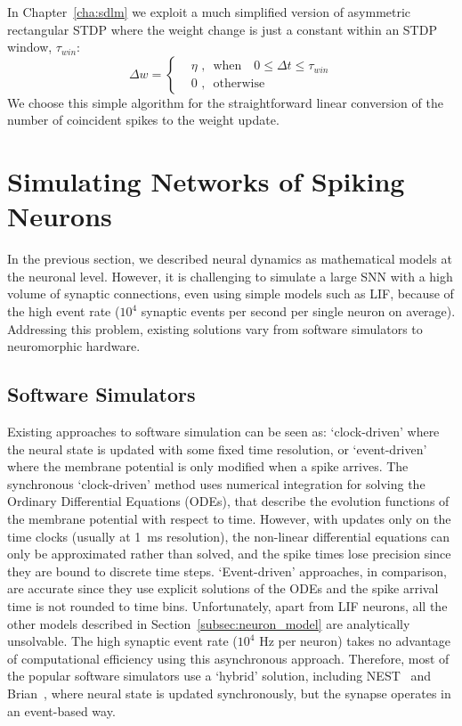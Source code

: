 In Chapter~\ref{cha:sdlm} we exploit a much simplified version of asymmetric rectangular STDP where the weight change is just a constant within an STDP window, $\tau_{win}$:
\begin{equation}
\Delta w = \left\{
\begin{aligned}
&\eta \textrm{~,~~when~~~} 0 \leq \Delta  t \leq \tau_{win}\\
& 0 \textrm{~,~~otherwise}
\end{aligned}
\right.
\end{equation}
We choose this simple algorithm for the straightforward linear conversion of the number of coincident spikes to the weight update.


\section{Simulating Networks of Spiking Neurons}
\label{sec:snn_sim}
In the previous section, we described neural dynamics as mathematical models at the neuronal level.
However, it is challenging to simulate a large SNN with a high volume of synaptic connections, even using simple models such as LIF, because of the high event rate ($10^4$ synaptic events per second per single neuron on average).
Addressing this problem, existing solutions vary from software simulators to neuromorphic hardware.

\subsection{Software Simulators}
Existing approaches to software simulation can be seen as: `clock-driven' where the neural state is updated with some fixed time resolution, or `event-driven' where the membrane potential is only modified when a spike arrives.
The synchronous `clock-driven' method uses numerical integration for solving the Ordinary Differential Equations (ODEs), that describe the evolution functions of the membrane potential with respect to time.
However, with updates only on the time clocks (usually at 1~ms resolution), the non-linear differential equations can only be approximated rather than solved, and the spike times lose precision since they are bound to discrete time steps.
`Event-driven' approaches, in comparison, are accurate since they use explicit solutions of the ODEs and the spike arrival time is not rounded to time bins.
Unfortunately, apart from LIF neurons, all the other models described in Section~\ref{subsec:neuron_model} are analytically unsolvable.
The high synaptic event rate ($10^4$ Hz per neuron) takes no advantage of computational efficiency using this asynchronous approach.
Therefore, most of the popular software simulators use a `hybrid' solution, including NEST~\citep{gewaltig2007nest} and Brian~\citep{goodman2008brian}, where 
neural state is updated synchronously, but the synapse operates in an event-based way.

